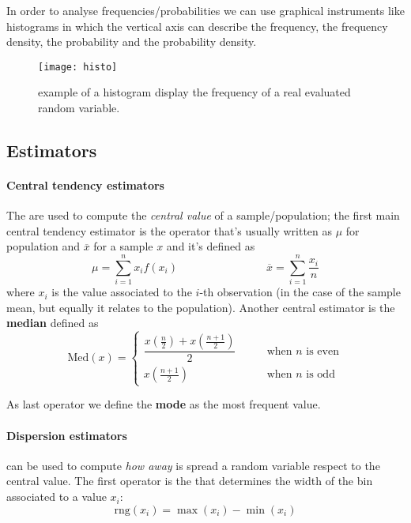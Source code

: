 	In order to analyse frequencies/probabilities we can use graphical instruments like histograms in which the vertical axis can describe the frequency, the frequency density, the probability and the probability density.
	
	\begin{SCfigure}[1][bht]
		\centering \texttt{[image: histo]}
		\caption{example of a histogram display the frequency of a real evaluated random variable.}
	\end{SCfigure}

\subsection{Estimators}
	\paragraph{Central tendency estimators} The  are used to compute the \textit{central value} of a sample/population; the first main central tendency estimator is the  operator that's usually written as $\mu$ for population and $\overline x$ for a sample $x$ and it's defined as
	\begin{equation}
		\mu = \sum_{i=1}^n x_i f(x_i) \qquad \qquad \qquad \qquad \overline x = \sum_{i=1}^n \frac{x_i}{n}
	\end{equation}
	where $x_i$ is the value associated to the $i$-th observation (in the case of the sample mean, but equally it relates to the population). Another central estimator is the \textbf{median} defined as
	\begin{equation}
		\textrm{Med}(x) = \begin{cases}
			\dfrac{x\left(\frac n2\right) + x\left(\frac{n+1}{2}\right) }{2} \qquad & \textrm{when $n$ is even} \\
			x\left(\frac{n+1}{2}\right) \qquad & \textrm{when $n$ is odd}
		\end{cases}
	\end{equation} 
	
	As last operator we define the \textbf{mode} as the most frequent value.
	
	\paragraph{Dispersion estimators}  can be used to compute \textit{how away} is spread a random variable respect to the central value. The first operator is the  that determines the width of the bin associated to a value $x_i$:
	\begin{equation}
		\textrm{rng}(x_i) = \max(x_i) - \min(x_i)
	\end{equation}
	
